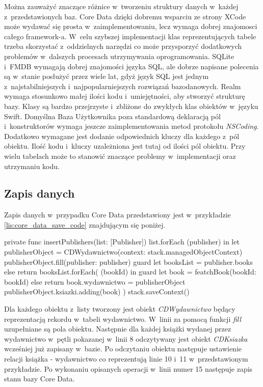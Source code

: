Można zauważyć znaczące różnice w~tworzeniu struktury danych w~każdej z~przedstawionych baz. Core Data dzięki dobremu wsparciu ze strony XCode może wydawać się prosta w~zaimplementowaniu, lecz wymaga dobrej znajomosci całego framework-a. W~celu szybszej implementacji klas reprezentujących tabele trzeba skorzystać z~oddzielnych narzędzi co może przysporzyć dodatkowych problemów w~dalszych procesach utrzymywania oprogramowania. SQLite i~FMDB wymagają dobrej znajomości języka SQL, ale dobrze napisane polecenia są w~stanie posłużyć przez wiele lat, gdyż język SQL jest jednym z~najstabilniejszych i~najpopularniejszych rozwiązań bazodanowych. Realm wymaga stosunkowo małej ilości kodu i~umiejętności, aby stworzyć strukturę bazy. Klasy są bardzo przejrzyste i~zbliżone do zwykłych klas obiektów w~języku Swift. Domyślna Baza Użytkownika poza standardową deklaracją pól i~konstruktorów wymaga jeszcze zaimplementowania metod protokołu \textit{NSCoding}. Dodatkowo wymagane jest dodanie odpowiednich kluczy dla każdego z~pól obiektu. Ilość kodu i~kluczy uzależniona jest tutaj od ilości pól obiektu. Przy wielu tabelach może to stanowić znaczące problemy w~implementacji oraz utrzymaniu kodu. 

\subsection{Zapis danych}

Zapis danych w~przypadku Core Data przedstawiony jest w~przykładzie \ref{lis:core_data_save_code} znajdującym się poniżej.

\begin{code}[
		language=swift,
		caption={Przykład zapisu obiektu Core Data},
		label={lis:core_data_save_code},
	]
    private func insertPublishers(list: [Publisher]) {
        list.forEach { (publisher) in
            let publisherObject = CDWydawnictwo(context: stack.managedObjectContext)
            publisherObject.fill(publisher: publisher)
            guard let booksList = publisher.books else { return }
            booksList.forEach({ (bookId) in
                guard let book = featchBook(bookId: bookId) else { return }
                book.wydawnictwo = publisherObject
                publisherObject.ksiazki.adding(book)
            })
        }
        stack.saveContext()
    }
\end{code}

Dla każdego obiektu z~listy tworzony jest obiekt \textit{CDWydawnictwo} będący reprezentacją rekordu w~tabeli wydawnictwo. W~linii za pomocą funkcji \textit{fill} uzupełniane są pola obiektu. Następnie dla każdej książki wydanej przez wydawnictwo w~pętli pokazanej w~linii 8 odczytywany jest obiekt \textit{CDKsiazka} wcześniej już zapisany w~bazie. Po odczytaniu obiektu następuje ustawienie relacji książka - wydawnictwo co reprezentują linie 10 i~11 w~przedstawionym przykładzie. Po wykonaniu opisanych operacji w~linii numer 15 następuje zapis stanu bazy Core Data. 

